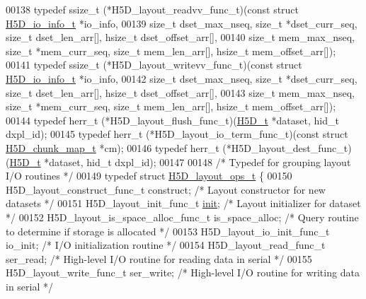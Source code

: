 \begin{DoxyCode}
00138 \textcolor{keyword}{typedef} ssize\_t (*H5D\_layout\_readvv\_func\_t)(\textcolor{keyword}{const} \textcolor{keyword}{struct }\hyperlink{struct_h5_d__io__info__t}{H5D\_io\_info\_t} *io\_info,
00139     \textcolor{keywordtype}{size\_t} dset\_max\_nseq, \textcolor{keywordtype}{size\_t} *dset\_curr\_seq, \textcolor{keywordtype}{size\_t} dset\_len\_arr[], hsize\_t dset\_offset\_arr[],
00140     \textcolor{keywordtype}{size\_t} mem\_max\_nseq, \textcolor{keywordtype}{size\_t} *mem\_curr\_seq, \textcolor{keywordtype}{size\_t} mem\_len\_arr[], hsize\_t mem\_offset\_arr[]);
00141 \textcolor{keyword}{typedef} ssize\_t (*H5D\_layout\_writevv\_func\_t)(\textcolor{keyword}{const} \textcolor{keyword}{struct }\hyperlink{struct_h5_d__io__info__t}{H5D\_io\_info\_t} *io\_info,
00142     \textcolor{keywordtype}{size\_t} dset\_max\_nseq, \textcolor{keywordtype}{size\_t} *dset\_curr\_seq, \textcolor{keywordtype}{size\_t} dset\_len\_arr[], hsize\_t dset\_offset\_arr[],
00143     \textcolor{keywordtype}{size\_t} mem\_max\_nseq, \textcolor{keywordtype}{size\_t} *mem\_curr\_seq, \textcolor{keywordtype}{size\_t} mem\_len\_arr[], hsize\_t mem\_offset\_arr[]);
00144 \textcolor{keyword}{typedef} herr\_t (*H5D\_layout\_flush\_func\_t)(\hyperlink{struct_h5_d__t}{H5D\_t} *dataset, hid\_t dxpl\_id);
00145 \textcolor{keyword}{typedef} herr\_t (*H5D\_layout\_io\_term\_func\_t)(\textcolor{keyword}{const} \textcolor{keyword}{struct }\hyperlink{struct_h5_d__chunk__map__t}{H5D\_chunk\_map\_t} *cm);
00146 \textcolor{keyword}{typedef} herr\_t (*H5D\_layout\_dest\_func\_t)(\hyperlink{struct_h5_d__t}{H5D\_t} *dataset, hid\_t dxpl\_id);
00147 
00148 \textcolor{comment}{/* Typedef for grouping layout I/O routines */}
00149 \textcolor{keyword}{typedef} \textcolor{keyword}{struct }\hyperlink{struct_h5_d__layout__ops__t}{H5D\_layout\_ops\_t} \{
00150     H5D\_layout\_construct\_func\_t construct;      \textcolor{comment}{/* Layout constructor for new datasets */}
00151     H5D\_layout\_init\_func\_t \hyperlink{structinit}{init};        \textcolor{comment}{/* Layout initializer for dataset */}
00152     H5D\_layout\_is\_space\_alloc\_func\_t is\_space\_alloc;    \textcolor{comment}{/* Query routine to determine if storage is
       allocated */}
00153     H5D\_layout\_io\_init\_func\_t io\_init;  \textcolor{comment}{/* I/O initialization routine */}
00154     H5D\_layout\_read\_func\_t ser\_read;    \textcolor{comment}{/* High-level I/O routine for reading data in serial */}
00155     H5D\_layout\_write\_func\_t ser\_write;  \textcolor{comment}{/* High-level I/O routine for writing data in serial */}

\end{DoxyCode}
